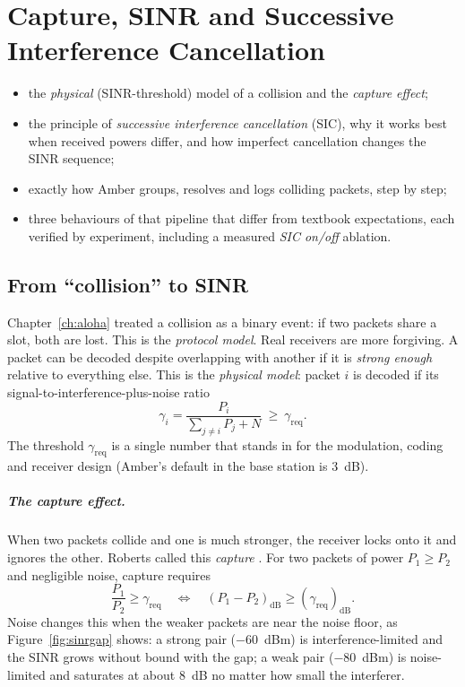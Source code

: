 \chapter{Capture, SINR and Successive Interference Cancellation}
\label{ch:sic}

\begin{defbox}
\begin{itemize}
 \item the \emph{physical} (SINR-threshold) model of a collision and the \emph{capture effect};
 \item the principle of \emph{successive interference cancellation} (SIC), why it works best when received powers differ, and how imperfect cancellation changes the SINR sequence;
 \item exactly how Amber groups, resolves and logs colliding packets, step by step;
 \item three behaviours of that pipeline that differ from textbook expectations, each verified by experiment, including a measured \emph{SIC on/off} ablation.
\end{itemize}
\end{defbox}

\section{From ``collision'' to SINR}
\label{sec:physmodel}

Chapter~\ref{ch:aloha} treated a collision as a binary event: if two packets share a
slot, both are lost. This is the \emph{protocol model}. Real receivers are more
forgiving. A packet can be decoded despite overlapping with another if it is
\emph{strong enough} relative to everything else. This is the \emph{physical model}: packet $i$ is
decoded if its signal-to-interference-plus-noise ratio
\begin{equation}
 \gamma_i=\frac{P_i}{\sum_{j\ne i}P_j+N}\ \ge\ \gamma_{\mathrm{req}}.
\label{eq:sinrdef}
\end{equation}
The threshold $\gamma_{\mathrm{req}}$ is a single number that stands in for the modulation, coding and
receiver design (Amber's default in the base station is $3$~dB).

\paragraph{The capture effect.}
When two packets collide and one is much stronger, the receiver locks onto it and ignores the other. Roberts called this
\emph{capture} \citep{roberts1975}. For two packets of power $P_1\ge P_2$ and negligible noise, capture requires
\[
 \frac{P_1}{P_2}\ge\gamma_{\mathrm{req}}
 \quad\Longleftrightarrow\quad
 (P_1-P_2)_{\mathrm{dB}}\ge(\gamma_{\mathrm{req}})_{\mathrm{dB}}.
\]
Noise changes this when the weaker packets are near the noise floor, as Figure~\ref{fig:sinrgap} shows: a strong
pair ($-60$~dBm) is interference-limited and the SINR grows without bound with the gap; a weak pair ($-80$~dBm)
is noise-limited and saturates at about $8$~dB no matter how small the interferer.

